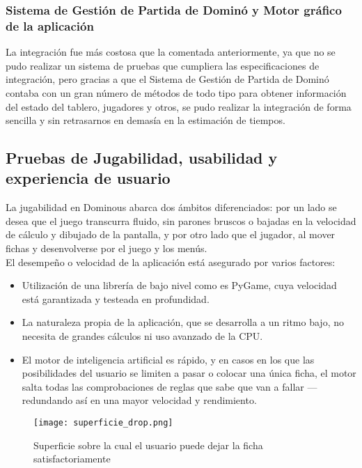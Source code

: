 \subsubsection{Sistema de Gestión de Partida de Dominó y Motor gráfico de la aplicación}

La integración fue más costosa que la comentada anteriormente, ya que no se pudo realizar un sistema de pruebas que
cumpliera las especificaciones de integración, pero gracias a que el Sistema de Gestión de Partida de Dominó contaba
con un gran número de métodos de todo tipo para obtener información del estado del tablero, jugadores y otros,
se pudo realizar la integración de forma sencilla y sin retrasarnos en demasía en la estimación de tiempos.


\subsection{Pruebas de Jugabilidad, usabilidad y experiencia de usuario}

La jugabilidad en Dominous abarca dos ámbitos diferenciados: por un lado se desea que el juego transcurra fluido, sin
parones bruscos o bajadas en la velocidad de cálculo y dibujado de la pantalla, y por otro lado que el jugador, al mover
fichas y desenvolverse por el juego y los menús. \\

El desempeño o velocidad de la aplicación está asegurado por varios factores:

\begin{itemize}
    \item Utilización de una librería de bajo nivel como es PyGame, cuya velocidad está garantizada y testeada en profundidad.
    \item La naturaleza propia de la aplicación, que se desarrolla a un ritmo bajo, no necesita de grandes cálculos ni
            uso avanzado de la CPU.
    \item El motor de inteligencia artificial es rápido, y en casos en los que las posibilidades del usuario se limiten
            a pasar o colocar una única ficha, el motor salta todas las comprobaciones de reglas que sabe que van a
            fallar --- redundando así en una mayor velocidad y rendimiento.
\end{itemize}

\begin{figure}[h]
  \label{superficie_drop}
  \begin{center}
    \texttt{[image: superficie\_drop.png]}
  \end{center}
  \caption{Superficie sobre la cual el usuario puede dejar la ficha satisfactoriamente}
\end{figure}


